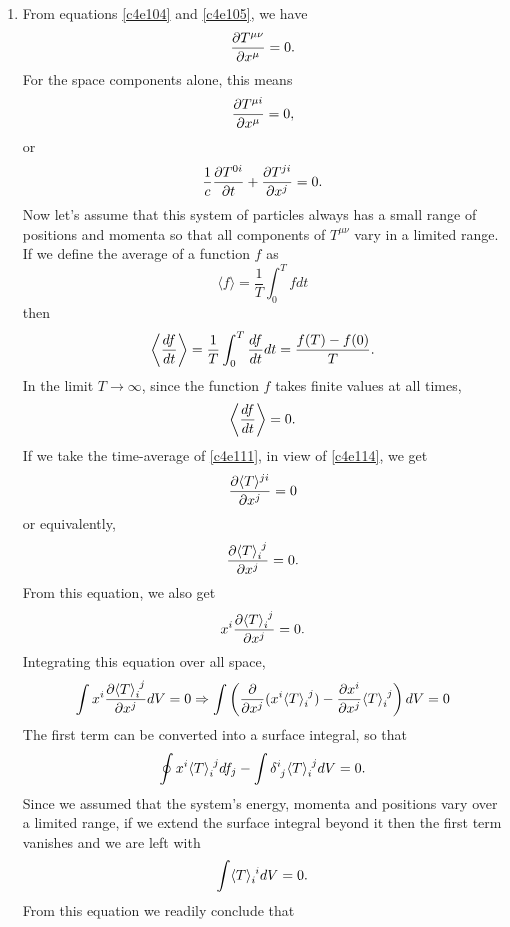 \begin{enumerate}
\item From equations \eqref{c4e104} and \eqref{c4e105}, we have
\begin{equation}\label{c4e110}
\frac{\partial{T^{\mu\nu}}}{\partial{x^\mu}} = 0.
\end{equation}
For the space components alone, this means
\[
\frac{\partial{T^{\mu i}}}{\partial{x^\mu}} = 0,
\]
or
\begin{equation}\label{c4e111}
\frac{1}{c}\frac{\partial{T^{0i}}}{\partial{t}} + \frac{\partial{T^{ji}}}{\partial{x^j}} = 0.
\end{equation}
Now let's assume that this system of particles always has a small range of
positions and momenta so that all components of $T^{\mu\nu}$ vary in a limited
range. If we define the average of a function $f$ as
\begin{equation}\label{c4e112}
\langle f \rangle = \frac{1}{T}\int_0^T fdt
\end{equation}
then
\begin{equation}\label{c4e113}
\left\langle\frac{d{f}}{d{t}}\right\rangle = \frac{1}{T} \int_0^T \frac{d{f}}{d{t}}dt = 
\frac{f(T) - f(0)}{T}.
\end{equation}
In the limit $T \rightarrow \infty$, since the function $f$ takes finite
values at all times,
\begin{equation}\label{c4e114}
\left\langle\frac{d{f}}{d{t}}\right\rangle = 0.
\end{equation}
If we take the time-average of \eqref{c4e111}, in view of \eqref{c4e114}, we get
\[
\frac{\partial{\langle T\rangle^{ji}}}{\partial{x^j}} = 0
\]
or equivalently,
\begin{equation}\label{c4e115}
\pdt{\tensor{\langle T \rangle}{_i^j}}{x^j} = 0.
\end{equation}
From this equation, we also get
\[
x^i\pdt{\tensor{\langle T \rangle}{_i^j}}{x^j} = 0.
\]
Integrating this equation over all space,
\[
\int x^i\pdt{\tensor{\langle T \rangle}{_i^j}}{x^j} dV = 0 \Rightarrow 
\int \left(\frac{\partial}{\partial x^j}(x^i\tensor{\langle T \rangle}{_i^j}) - 
\pdt{x^i}{x^j}\tensor{\langle T \rangle}{_i^j}\right)dV = 0
\]
The first term can be converted into a surface integral, so that
\[
\oint x^i\tensor{\langle T \rangle}{_i^j} df_j - 
\int \tensor{\delta}{^i_j}\tensor{\langle T \rangle}{_i^j} dV = 0.
\]
Since we assumed that the system's energy, momenta and positions vary over a 
limited range, if we extend the surface integral beyond it then the first term
vanishes and we are left with
\begin{equation}\label{c4e116}
\int \tensor{\langle T \rangle}{_i^i} dV = 0.
\end{equation}
From this equation we readily conclude that

\end{enumerate}
